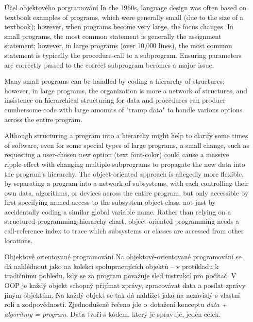 \begin{obecne}{Účel objektového porgramování}
In the 1960s, language design was often based on textbook examples of programs, which were generally small (due to the size of a textbook); however, when programs become very large, the focus changes. In small programs, the most common statement is generally the assignment statement; however, in large programs (over 10,000 lines), the most common statement is typically the procedure-call to a subprogram. Ensuring parameters are correctly passed to the correct subprogram becomes a major issue.

Many small programs can be handled by coding a hierarchy of structures; however, in large programs, the organization is more a network of structures, and insistence on hierarchical structuring for data and procedures can produce cumbersome code with large amounts of "tramp data" to handle various options across the entire program. 

Although structuring a program into a hierarchy might help to clarify some times of software, even for some special types of large programs, a small change, such as requesting a user-chosen new option (text font-color) could cause a massive ripple-effect with changing multiple subprograms to propagate the new data into the program's hierarchy. The object-oriented approach is allegedly more flexible, by separating a program into a network of subsystems, with each controlling their own data, algorithms, or devices across the entire program, but only accessible by first specifying named access to the subsystem object-class, not just by accidentally coding a similar global variable name. Rather than relying on a structured-programming hierarchy chart, object-oriented programming needs a call-reference index to trace which subsystems or classes are accessed from other locations.
\end{obecne}


\begin{definiceN}{Objektově orientované programování}
Na objektově-orientované programování se dá nahlédnout jako na kolekci spolupracujících objektů -- v protikladu k tradičnímu pohledu, kdy se za program považuje sled instrukcí pro počítač. V OOP je každý objekt schopný přijímat zprávy, zpracovávat data a posílat zprávy jiným objektům. Na každý objekt se tak dá nahlížet jako na nezávislý  s vlastní rolí a zodpovědností. Zjednodušeně řečeno jde o~dotažení konceptu \emph{data + algoritmy = program}. Data tvoří s kódem, který je spravuje, jeden celek.
\end{definiceN}

